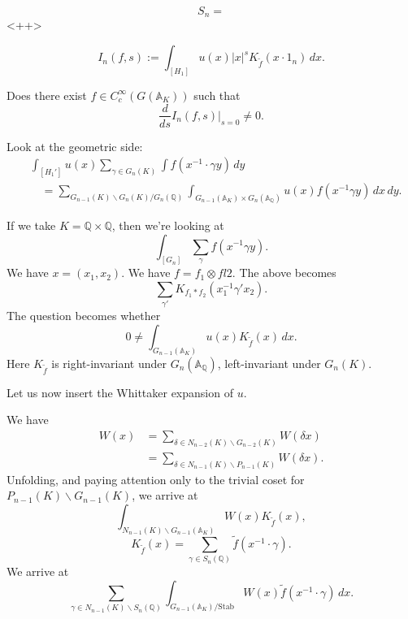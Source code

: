 \documentclass[reqno]{amsart} 
\begin{document}
\begin{equation*}
S_n = 
\end{equation*}<++>


\begin{equation*}
I_n(f, s) := \int_{[H_1]} u(x) \lvert x \rvert^s K_{\tilde{f}}(x \cdot 1_n) \, d x.
\end{equation*}
\begin{question}\label{question:cnfg5j0r2o}
  Does there exist $f \in C_c^\infty(G(\mathbb{A}_K))$ such that
  \begin{equation*}
    \frac{d}{d s}
    I_n(f, s)|_{s=0} \neq 0.
  \end{equation*}
\end{question}
Look at the geometric side:
\begin{align*}
  &\int_{[H_1']} u(x) \sum_{\gamma \in G_n(K)} \int f(x^{-1} \cdot \gamma y) \,d y
  \\
  &\quad
    =
    \sum_{G_{n - 1}(K) \backslash G_n(K) / G_n(\mathbb{Q})}
    \int_{G_{n-1}(\mathbb{A}_K) \times G_n(\mathbb{A}_{\mathbb{Q}})} u(x) f(x^{-1} \gamma y) \, d x \, d y.
\end{align*}

If we take $K = \mathbb{Q} \times \mathbb{Q}$, then we're looking at
\begin{equation*}
\int_{[G_n]} \sum_\gamma f(x^{-1} \gamma y).
\end{equation*}
We have $x =(x_1, x_2)$.  We have $f = f_1 \otimes fl2$.  The above becomes
\begin{equation*}
\sum_{\gamma '} K_{f_1 \ast f_2}(x_1^{-1} \gamma ' x_2).
\end{equation*}
The question becomes whether
\begin{equation*}
0 \neq \int_{G_{n - 1}(\mathbb{A}_K)} u(x) K_{\tilde{f}}(x) \,d x.
\end{equation*}
Here $K_{\tilde{f}}$ is right-invariant under $G_n(\mathbb{A}_{\mathbb{Q}})$, left-invariant under $G_n(K)$.

Let us now insert the Whittaker expansion of $u$.

We have
\begin{align*}
  W(x) &= \sum_{\delta \in N_{n - 2}(K) \backslash G_{n - 2}(K)} W(\delta x) \\
       &= \sum_{\delta \in N_{n - 1}(K) \backslash P_{n - 1}(K)} W(\delta x).
\end{align*}
Unfolding, and paying attention only to the trivial coset for $P_{n-1}(K) \backslash G_{n-1}(K)$, we arrive at
\begin{equation*}
  \int_{N_{n - 1}(K) \backslash G_{n - 1}(\mathbb{A}_K)}
  W(x) K_{\tilde{f}}(x),
\end{equation*}
\begin{equation*}
K_{\tilde{f}}(x) = \sum_{\gamma \in S_n(\mathbb{Q})} \tilde{f}(x^{-1} \cdot \gamma).
\end{equation*}
We arrive at
\begin{equation*}
  \sum_{\gamma \in N_{n - 1}(K) \backslash S_n(\mathbb{Q})}
  \int_{G_{n - 1}(\mathbb{A}_K) / \mathrm{Stab}}
  W(x) \tilde{f}(x^{-1} \cdot \gamma) \, d x.
\end{equation*}
\end{document}

